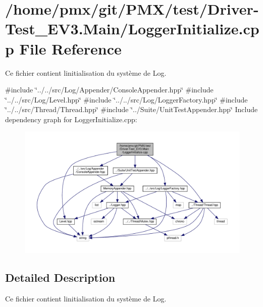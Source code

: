\hypertarget{test_2Driver-Test__EV3_8Main_2LoggerInitialize_8cpp}{}\section{/home/pmx/git/\+P\+M\+X/test/\+Driver-\/\+Test\+\_\+\+E\+V3.Main/\+Logger\+Initialize.cpp File Reference}
\label{test_2Driver-Test__EV3_8Main_2LoggerInitialize_8cpp}


Ce fichier contient l\textquotesingle{}initialisation du système de Log.  


{\ttfamily \#include \char`\"{}../../src/\+Log/\+Appender/\+Console\+Appender.\+hpp\char`\"{}}\newline
{\ttfamily \#include \char`\"{}../../src/\+Log/\+Level.\+hpp\char`\"{}}\newline
{\ttfamily \#include \char`\"{}../../src/\+Log/\+Logger\+Factory.\+hpp\char`\"{}}\newline
{\ttfamily \#include \char`\"{}../../src/\+Thread/\+Thread.\+hpp\char`\"{}}\newline
{\ttfamily \#include \char`\"{}../\+Suite/\+Unit\+Test\+Appender.\+hpp\char`\"{}}\newline
Include dependency graph for Logger\+Initialize.\+cpp\+:
\nopagebreak
\begin{figure}[H]
\begin{center}
\leavevmode
\includegraphics[width=350pt]{test_2Driver-Test__EV3_8Main_2LoggerInitialize_8cpp__incl}
\end{center}
\end{figure}


\subsection{Detailed Description}
Ce fichier contient l\textquotesingle{}initialisation du système de Log. 

